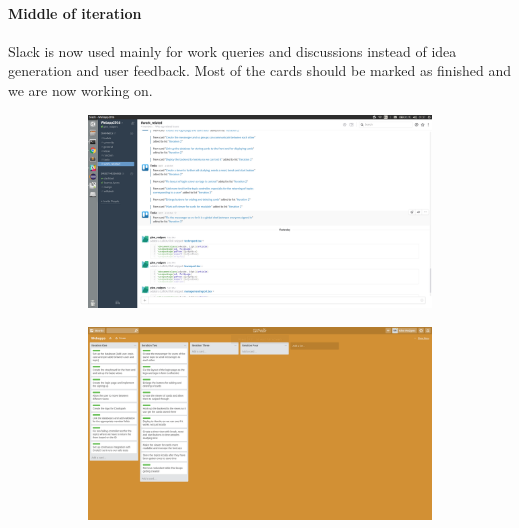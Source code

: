 \documentclass[a4wide, 10pt]{article}
\begin{document}
\vspace{-0.3cm}
\paragraph{Middle of iteration} 
Slack is now used mainly for work queries and discussions instead of idea generation and user feedback.  Most of the cards should be marked as finished and we are now working on.
\begin{figure}[h]
\centering
\begin{subfigure}{.5\textwidth}
  \centering
  	\includegraphics[scale=0.1]{slackmiddle.png} 
  \label{fig:sub1}
\end{subfigure}%
\begin{subfigure}{.5\textwidth}
  \centering
  	\includegraphics[scale=0.1]{iterationmiddle.png} 
  \label{fig:sub2}
\end{subfigure}
\label{fig:test}
\end{figure}
\vspace*{-\baselineskip} 

\vspace{-0.3cm}
\end{document}
